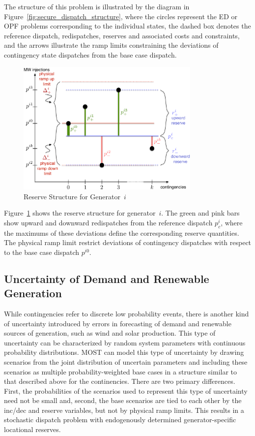 \documentclass[12pt]{article}
\newcommand{\most}[0]{{MOST}}
\numberwithin{equation}{section}
\numberwithin{table}{section}
\numberwithin{figure}{section}
\begin{document}
The structure of this problem is illustrated by the diagram in Figure~\ref{fig:secure_dispatch_structure}, where the circles represent the ED or OPF problems corresponding to the individual states, the dashed box denotes the reference dispatch, redispatches, reserves and associated costs and constraints, and the arrows illustrate the ramp limits constraining the deviations of contingency state dispatches from the base case dispatch.

\begin{figure}[hbtp]
  \centering
  \includegraphics[width=0.8\textwidth]{./figures/reserves-single-base}
  \caption{Reserve Structure for Generator~$i$}
  \label{fig:reserves_single_base}
\end{figure}

Figure~\ref{fig:reserves_single_base} shows the reserve structure for generator~$i$. The green and pink bars show upward and downward redispatches from the reference dispatch $p_c^i$, where the maximums of these deviations define the corresponding reserve quantities. The physical ramp limit restrict deviations of contingency dispatches with respect to the base case dispatch $p^{i0}$.

\subsection{Uncertainty of Demand and Renewable Generation}

While contingencies refer to discrete low probability events, there is another kind of uncertainty introduced by errors in forecasting of demand and renewable sources of generation, such as wind and solar production. This type of uncertainty can be characterized by random system parameters with continuous probability distributions. \most{} can model this type of uncertainty by drawing scenarios from the joint distribution of uncertain parameters and including these scenarios as multiple probability-weighted base cases in a structure similar to that described above for the continencies. There are two primary differences. First, the probabilities of the scenarios used to represent this type of uncertainty need not be small and, second, the base scenarios are tied to each other by the inc/dec and reserve variables, but not by physical ramp limits. This results in a stochastic dispatch problem with endogenously determined generator-specific locational reserves.
\end{document}
